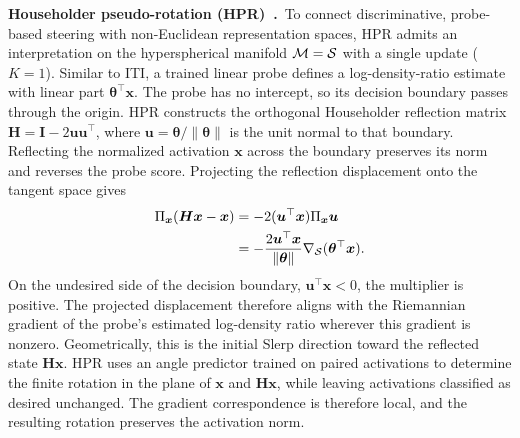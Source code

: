 \noindent\textbf{Householder pseudo-rotation (HPR)~\citep{pham2024householder}.}~To connect discriminative, probe-based steering with non-Euclidean representation spaces, HPR admits an interpretation on the hyperspherical manifold $\mathcal{M}=\mathcal{S}$ with a single update ($K=1$). Similar to ITI, a trained linear probe defines a log-density-ratio estimate with linear part $\boldsymbol{\theta}^{\top}\boldsymbol{x}$. The probe has no intercept, so its decision boundary passes through the origin. HPR constructs the orthogonal Householder reflection matrix $\boldsymbol{H}=\boldsymbol{I}-2\boldsymbol{u}\boldsymbol{u}^{\top}$, where $\boldsymbol{u}=\boldsymbol{\theta}/\|\boldsymbol{\theta}\|$ is the unit normal to that boundary. Reflecting the normalized activation $\boldsymbol{x}$ across the boundary preserves its norm and reverses the probe score. Projecting the reflection displacement onto the tangent space gives
\[
\begin{aligned}
\Pi_{\boldsymbol{x}}(\boldsymbol{H}\boldsymbol{x}-\boldsymbol{x})
&=-2(\boldsymbol{u}^{\top}\boldsymbol{x})\Pi_{\boldsymbol{x}}\boldsymbol{u}\\
&=-\frac{2\boldsymbol{u}^{\top}\boldsymbol{x}}{\|\boldsymbol{\theta}\|}
\nabla_{\mathcal{S}}(\boldsymbol{\theta}^{\top}\boldsymbol{x}).
\end{aligned}
\]
On the undesired side of the decision boundary, $\boldsymbol{u}^{\top}\boldsymbol{x}<0$, the multiplier is positive. The projected displacement therefore aligns with the Riemannian gradient of the probe's estimated log-density ratio wherever this gradient is nonzero. Geometrically, this is the initial Slerp direction toward the reflected state $\boldsymbol{H}\boldsymbol{x}$. HPR uses an angle predictor trained on paired activations to determine the finite rotation in the plane of $\boldsymbol{x}$ and $\boldsymbol{H}\boldsymbol{x}$, while leaving activations classified as desired unchanged. The gradient correspondence is therefore local, and the resulting rotation preserves the activation norm.

